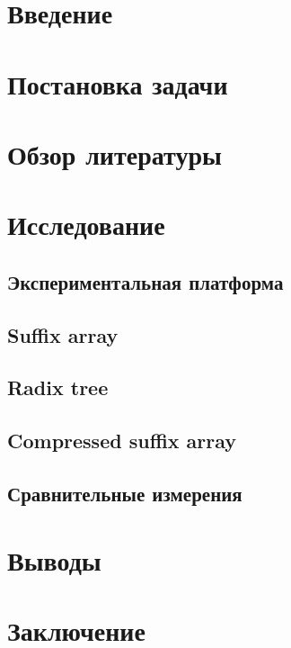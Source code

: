 \newpage
\tableofcontents
\newpage

\section{Введение}


\newpage
\section{Постановка задачи}


\newpage
\section{Обзор литературы}


\newpage
\section{Исследование}


\newpage
\subsection{Экспериментальная платформа}


\newpage
\subsection{Suffix array}


\newpage
\subsection{Radix tree}


\newpage
\subsection{Compressed suffix array}


\newpage
\subsection{Сравнительные измерения}


\newpage
\section{Выводы}


\newpage
\section{Заключение}


\newpage
%



